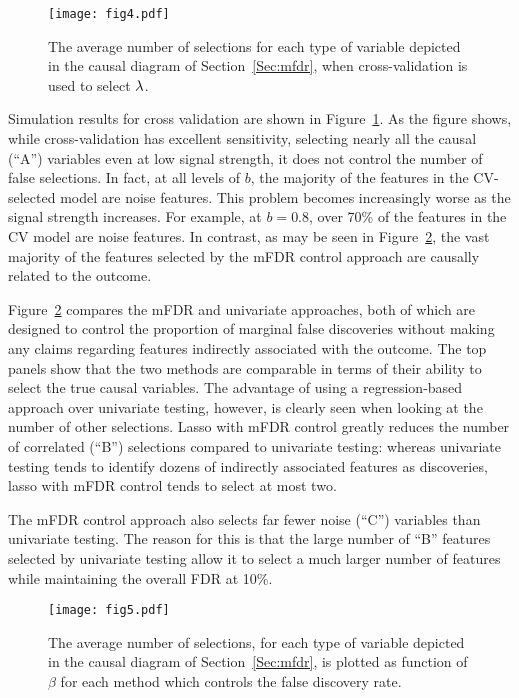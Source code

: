 \begin{figure} [!ht]
 \centering
  \texttt{[image: fig4.pdf]}
  \caption{\label{Fig:cv} The average number of selections for each type of variable depicted in the causal diagram of Section~\ref{Sec:mfdr}, when cross-validation is used to select $\lambda$.}
\end{figure}

Simulation results for cross validation are shown in Figure~\ref{Fig:cv}.  As the figure shows, while cross-validation has excellent sensitivity, selecting nearly all the causal (``A'') variables even at low signal strength, it does not control the number of false selections.  In fact, at all levels of $b$, the majority of the features in the CV-selected model are noise features.  This problem becomes increasingly worse as the signal strength increases.  For example, at $b=0.8$, over 70\% of the features in the CV model are noise features.  In contrast, as may be seen in Figure~\ref{Fig:univariate}, the vast majority of the features selected by the mFDR control approach are causally related to the outcome.

Figure~\ref{Fig:univariate} compares the mFDR and univariate approaches, both of which are designed to control the proportion of marginal false discoveries without making any claims regarding features indirectly associated with the outcome. The top panels show that the two methods are comparable in terms of their ability to select the true causal variables.  The advantage of using a regression-based approach over univariate testing, however, is clearly seen when looking at the number of other selections.  Lasso with mFDR control greatly reduces the number of correlated (``B'') selections compared to univariate testing: whereas univariate testing tends to identify dozens of indirectly associated features as discoveries, lasso with mFDR control tends to select at most two.

The mFDR control approach also selects far fewer noise (``C'') variables than univariate testing.  The reason for this is that the large number of ``B'' features selected by univariate testing allow it to select a much larger number of features while maintaining the overall FDR at 10\%.

\begin{figure} [!htb]
 \centering
  \texttt{[image: fig5.pdf]}
  \caption{\label{Fig:univariate} The average number of selections, for each type of variable depicted in the causal diagram of Section~\ref{Sec:mfdr}, is plotted as function of $\beta$ for each method which controls the false discovery rate.}
\end{figure}

